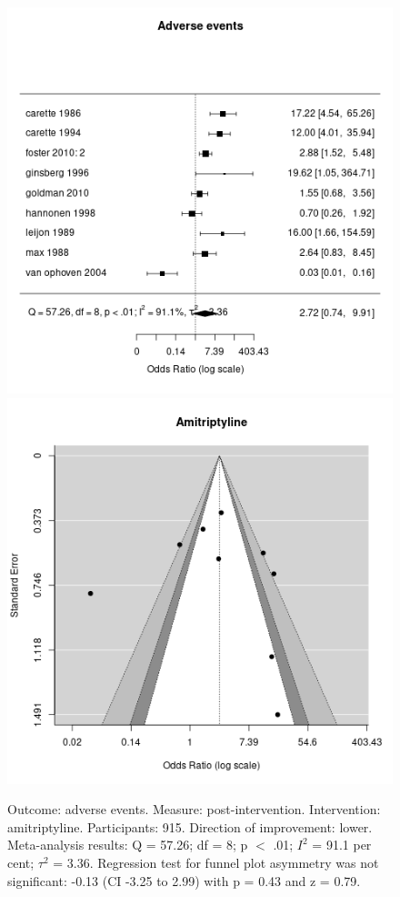 \documentclass{report}\usepackage[]{graphicx}\usepackage[]{color}
\newenvironment{knitrout}{}{} %
\begin{document}
\begin{figure}

\begin{knitrout}
\color{fgcolor}
\includegraphics[width=0.5\linewidth,height=0.35\textheight]{img/adverse-amitriptyline- - -forest} 
\includegraphics[width=0.5\linewidth,height=0.35\textheight]{img/adverse-amitriptyline- - -funnel} 
\end{knitrout}

\caption[Adverse events: amitriptyline]{Outcome: adverse events. Measure: post-intervention. Intervention: amitriptyline. Participants: 915. Direction of improvement: lower. Meta-analysis results: Q = 57.26; df = 8; p $<$ .01; $I^2$ = 91.1 per cent; $\tau^2$ = 3.36. Regression test for funnel plot asymmetry was not significant: -0.13 (CI -3.25 to 2.99) with p = 0.43 and z = 0.79.}
\label{fig:adverse-amitrip}
\end{figure}
\end{document}
